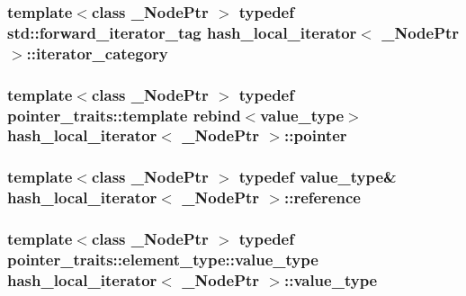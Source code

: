 \subsubsection[{iterator\+\_\+category}]{\setlength{\rightskip}{0pt plus 5cm}template$<$class \+\_\+\+Node\+Ptr $>$ typedef std\+::forward\+\_\+iterator\+\_\+tag {\bf hash\+\_\+local\+\_\+iterator}$<$ \+\_\+\+Node\+Ptr $>$\+::{\bf iterator\+\_\+category}}\label{classhash__local__iterator_a317e8344fdb30a1260fcb6acbc6a4148}
\hypertarget{classhash__local__iterator_a2916a4b3cab394878c6862b263e5841c}{}
\subsubsection[{pointer}]{\setlength{\rightskip}{0pt plus 5cm}template$<$class \+\_\+\+Node\+Ptr $>$ typedef pointer\+\_\+traits\+::template rebind$<${\bf value\+\_\+type}$>$ {\bf hash\+\_\+local\+\_\+iterator}$<$ \+\_\+\+Node\+Ptr $>$\+::{\bf pointer}}\label{classhash__local__iterator_a2916a4b3cab394878c6862b263e5841c}
\hypertarget{classhash__local__iterator_a1d2a04128228b447eb0c026e5004f247}{}
\subsubsection[{reference}]{\setlength{\rightskip}{0pt plus 5cm}template$<$class \+\_\+\+Node\+Ptr $>$ typedef {\bf value\+\_\+type}\& {\bf hash\+\_\+local\+\_\+iterator}$<$ \+\_\+\+Node\+Ptr $>$\+::{\bf reference}}\label{classhash__local__iterator_a1d2a04128228b447eb0c026e5004f247}
\hypertarget{classhash__local__iterator_a2680e7b16ebe6ca20f14176a5756155c}{}
\subsubsection[{value\+\_\+type}]{\setlength{\rightskip}{0pt plus 5cm}template$<$class \+\_\+\+Node\+Ptr $>$ typedef pointer\+\_\+traits\+::element\+\_\+type\+::value\+\_\+type {\bf hash\+\_\+local\+\_\+iterator}$<$ \+\_\+\+Node\+Ptr $>$\+::{\bf value\+\_\+type}}\label{classhash__local__iterator_a2680e7b16ebe6ca20f14176a5756155c}


